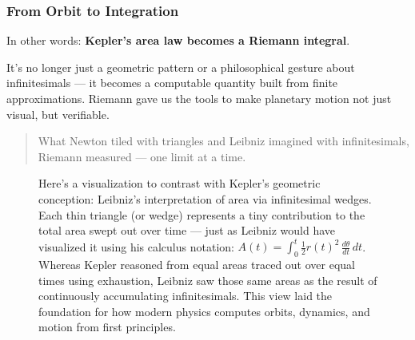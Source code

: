 \subsubsection*{From Orbit to Integration}

In other words: \textbf{Kepler’s area law becomes a Riemann integral}.

It’s no longer just a geometric pattern or a philosophical gesture about infinitesimals — it becomes a computable quantity built from finite approximations. Riemann gave us the tools to make planetary motion not just visual, but verifiable.

\begin{quote}
What Newton tiled with triangles and Leibniz imagined with infinitesimals, Riemann measured — one limit at a time.
\end{quote}


\begin{figure}[H]
\centering
{}
\caption{Here’s a visualization to contrast with Kepler’s geometric conception: Leibniz’s interpretation of area via infinitesimal wedges. Each thin triangle (or wedge) represents a tiny contribution to the total area swept out over time — just as Leibniz would have visualized it using his calculus notation: \( A(t) = \int_0^t \frac{1}{2} r(t)^2 \, \frac{d\theta}{dt} \, dt \). Whereas Kepler reasoned from equal areas traced out over equal times using exhaustion, Leibniz saw those same areas as the result of continuously accumulating infinitesimals. This view laid the foundation for how modern physics computes orbits, dynamics, and motion from first principles.}
\end{figure}



